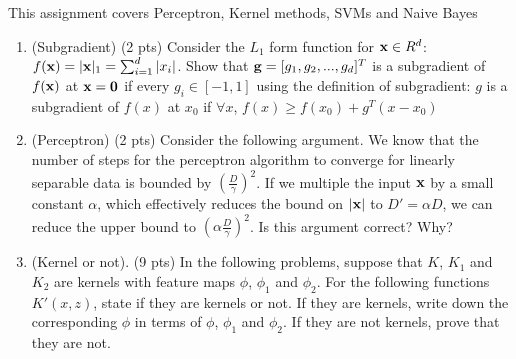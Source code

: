 \documentclass{article}
\def\x{{\bf x}}
\begin{document}
This assignment covers Perceptron, Kernel methods, SVMs and Naive Bayes
\begin{enumerate}
\item (Subgradient) (2 pts) Consider the $L_1$ form function for 
$\x\in R^d$: $f(\x)=|\x|_1=\sum_{i=1}^d|x_i|$. Show that 
${\bf g}=[g_1, g_2, ...,g_d]^T$ is a subgradient of $f(\x)$ at $\x={\bf 0}$ if 
every $g_i \in [-1,1] $ using the definition of subgradient: $g$ is a subgradient of $f(x)$ at $x_0$ if $\forall x$, $f(x)\geq f(x_0)+g^T(x-x_0)$


\item (Perceptron) (2 pts) Consider the following argument. We know that the 
number of steps for the perceptron algorithm to converge for linearly separable 
data is bounded by $(\frac{D}{\gamma})^2$. If we multiple the input $\x$ by a 
small constant $\alpha$, which effectively reduces the bound on $|\x|$ to 
$D' =\alpha D$, we can reduce the upper bound to $(\alpha \frac{D}{\gamma})^2$. 
Is this argument correct? Why? 


\item (Kernel or not). (9 pts) In the following problems, suppose that $K$, 
$K_1$ and $K_2$ are kernels with feature maps $\phi$, $\phi_1$ and $\phi_2$. 
For the following functions $K'(x, z)$, state if they are kernels or not. If 
they are kernels, write down the corresponding $\phi$ in terms of $\phi$, 
$\phi_1$ and $\phi_2$. If they are not kernels, prove that they are not.


\end{enumerate}
\end{document}
